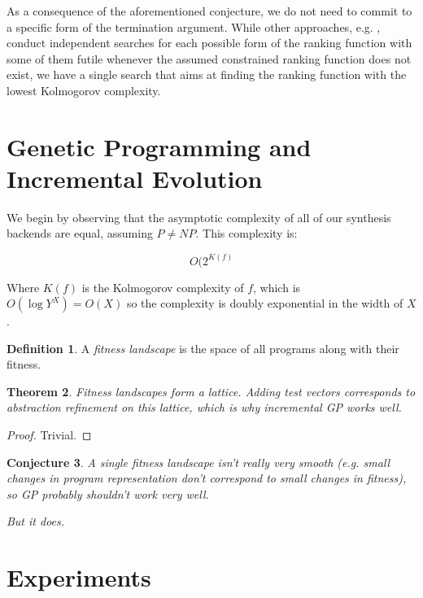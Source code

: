 \documentclass[preprint]{sigplanconf}
\newtheorem{theorem}{Theorem}
\newtheorem{conjecture}[theorem]{Conjecture}
\theoremstyle{definition}
\newtheorem{definition}[theorem]{Definition}
\begin{document}
As a consequence of the aforementioned conjecture, we do not need to commit to a specific form of the termination argument. While other approaches, e.g. \cite{DBLP:conf/tacas/LeikeH14}, 
conduct independent searches for each possible form of the ranking function with some of them futile whenever the assumed constrained ranking function does not exist, we have a single search that aims at finding the ranking function with the lowest Kolmogorov complexity. 
 




\section{Genetic Programming and Incremental Evolution}

We begin by observing that the asymptotic complexity of all of our synthesis
backends are equal, assuming $P \neq NP$.  This complexity is:

$$O(2^{K(f)}$$

Where $K(f)$ is the Kolmogorov complexity of $f$, which is $O(\log Y^X) = O(X)$
so the complexity is doubly exponential in the width of $X$.

\begin{definition}
 A \emph{fitness landscape} is the space of all programs along with their fitness.
\end{definition}

\begin{theorem}
 Fitness landscapes form a lattice.  Adding test vectors corresponds to abstraction refinement on this
 lattice, which is why incremental GP works well.
\end{theorem}

\begin{proof}
 Trivial.
\end{proof}


\begin{conjecture}
 A single fitness landscape isn't really very smooth (e.g. small changes in program representation
 don't correspond to small changes in fitness), so GP probably shouldn't work very well.
 
 But it does.
\end{conjecture}



\section{Experiments}
\end{document}

